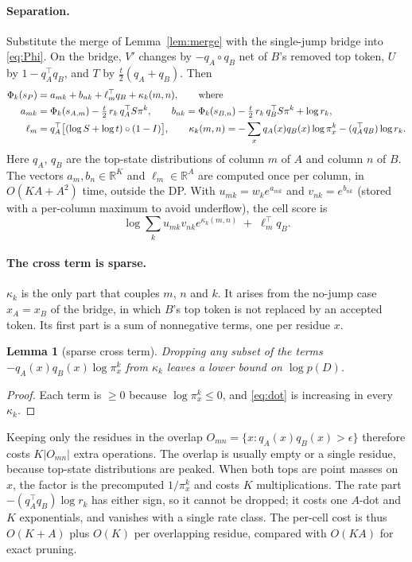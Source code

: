 \documentclass[11pt]{article}
\newtheorem{lemma}{Lemma}
\begin{document}
\paragraph{Separation.} Substitute the merge of Lemma~\ref{lem:merge} with the
single-jump bridge into \eqref{eq:Phi}. On the bridge, $V'$ changes by
$-q_A\circ q_B$ net of $B$'s removed top token, $U$ by $1-q_A^\top q_B$, and
$T$ by $\tfrac t2(q_A+q_B)$. Then
\begin{align}
\Phi_k(s_P)&=a_{mk}+b_{nk}+\ell_m^\top q_{B}
 +\kappa_k(m,n),\qquad\text{where}\notag\\
a_{mk}&=\Phi_k(s_{A,m})-\tfrac t2\,r_k\,q_{A}^\top S\pi^k,\qquad
b_{nk}=\Phi_k(s_{B,n})-\tfrac t2\,r_k\,q_{B}^\top S\pi^k+\log r_k,\notag\\
\ell_m&=q_A^\top\big[(\log S+\log t)\circ(1-I)\big],\qquad
\kappa_k(m,n)=-\sum_xq_A(x)q_B(x)\log\pi^k_x-(q_A^\top q_B)\log r_k.
\label{eq:sep}
\end{align}
Here $q_A$, $q_B$ are the top-state distributions of column $m$ of $A$ and
column $n$ of $B$. The vectors $a_m,b_n\in\mathbb R^K$ and
$\ell_m\in\mathbb R^A$ are computed once per column, in $O(KA+A^2)$ time, outside
the DP. With $u_{mk}=w_ke^{a_{mk}}$ and $v_{nk}=e^{b_{nk}}$ (stored with a
per-column maximum to avoid underflow), the cell score is
\begin{equation}\label{eq:dot}
\log\sum_ku_{mk}v_{nk}e^{\kappa_k(m,n)}\;+\;\ell_m^\top q_B.
\end{equation}

\paragraph{The cross term is sparse.} $\kappa_k$ is the only part that couples
$m$, $n$ and $k$. It arises from the no-jump case $x_A=x_B$ of the bridge, in
which $B$'s top token is not replaced by an accepted token. Its first part
is a sum of nonnegative terms, one per residue $x$.

\begin{lemma}[sparse cross term]\label{lem:sparse}
Dropping any subset of the terms $-q_A(x)q_B(x)\log\pi^k_x$ from $\kappa_k$
leaves a lower bound on $\log p(D)$.
\end{lemma}
\begin{proof}
Each term is $\ge0$ because $\log\pi^k_x\le0$, and \eqref{eq:dot} is
increasing in every $\kappa_k$.
\end{proof}

Keeping only the residues in the overlap
$O_{mn}=\{x:q_A(x)q_B(x)>\epsilon\}$ therefore costs $K|O_{mn}|$ extra
operations. The overlap is usually empty or a single residue, because top-state
distributions are peaked. When both tops are point masses on $x$, the factor
is the precomputed $1/\pi^k_x$ and costs $K$ multiplications. The rate part
$-(q_A^\top q_B)\log r_k$ has either sign, so it cannot be dropped; it costs
one $A$-dot and $K$ exponentials, and vanishes with a single rate class.
The per-cell cost is thus $O(K+A)$ plus $O(K)$ per overlapping residue,
compared with $O(KA)$ for exact pruning.
\end{document}
